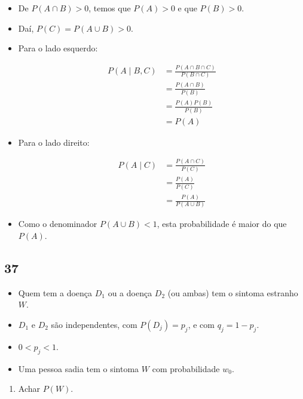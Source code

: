 \documentclass[
  11pt]{report}
\providecommand{\tightlist}{%
  \setlength{\itemsep}{0pt}\setlength{\parskip}{0pt}}
\begin{document}
\begin{itemize}
\item
  De $P(A \cap B) > 0$, temos que $P(A) > 0$ e que $P(B) > 0$.
\item
  Daí, $P(C) = P(A \cup B) > 0$.
\item
  Para o lado esquerdo:

  \[
  \begin{aligned}
  P(A \mid B, C) 
  &= \frac{P(A \cap B \cap C)}{P(B \cap C)} \\
  &= \frac{P(A \cap B)}{P(B)} \\
  &= \frac{P(A)P(B)}{P(B)} \\
  &= P(A)
  \end{aligned}
  \]
\item
  Para o lado direito:

  \[
  \begin{aligned}
  P(A \mid C) 
  &= \frac{P(A \cap C)}{P(C)} \\
  &= \frac{P(A)}{P(C)} \\
  &= \frac{P(A)}{P(A \cup B)} 
  \end{aligned}
  \]
\item
  Como o denominador $P(A \cup B) < 1$, esta probabilidade é maior do que $P(A)$.
\end{itemize}

\hypertarget{section-19}{%
\subsection*{37}\label{section-19}}

\begin{rmdbox}

\begin{itemize}
\item
  Quem tem a doença $D_1$ ou a doença $D_2$ (ou ambas) tem o sintoma estranho $W$.
\item
  $D_1$ e $D_2$ são independentes, com $P(D_j) = p_j$, e com $q_j = 1 - p_j$.
\item
  $0 < p_j < 1$.
\item
  Uma pessoa sadia tem o sintoma $W$ com probabilidade $w_0$.
\end{itemize}

\end{rmdbox}

\begin{rmdbox}

\begin{enumerate}
\def\labelenumi{\alph{enumi}.}
\tightlist
\item
  Achar $P(W)$.
\end{enumerate}

\end{rmdbox}
\end{document}
